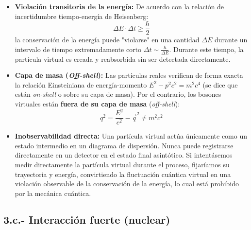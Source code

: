 \begin{observacion}
\begin{itemize}
    \item \textbf{Violación transitoria de la energía:} De acuerdo con la relación de incertidumbre tiempo-energía de Heisenberg:
    \begin{equation}
        \Delta E \cdot \Delta t \ge \frac{\hbar}{2}
    \end{equation}
    la conservación de la energía puede "violarse" en una cantidad $\Delta E$ durante un intervalo de tiempo extremadamente corto $\Delta t \sim \frac{\hbar}{\Delta E}$. Durante este tiempo, la partícula virtual es creada y reabsorbida sin ser detectada directamente.
    
    \item \textbf{Capa de masa (\textit{Off-shell}):} Las partículas reales verifican de forma exacta la relación Einsteiniana de energía-momento $E^2 - p^2 c^2 = m^2 c^4$ (se dice que están \textit{on-shell} o sobre su capa de masa). Por el contrario, los bosones virtuales están \textbf{fuera de su capa de masa} (\textit{off-shell}):
    \begin{equation}
        q^2 = \frac{E^2}{c^2} - \vec{q}^2 \neq m^2 c^2
    \end{equation}
    
    \item \textbf{Inobservabilidad directa:} Una partícula virtual actúa únicamente como un estado intermedio en un diagrama de dispersión. Nunca puede registrarse directamente en un detector en el estado final asintótico. Si intentásemos medir directamente la partícula virtual durante el proceso, fijaríamos su trayectoria y energía, convirtiendo la fluctuación cuántica virtual en una violación observable de la conservación de la energía, lo cual está prohibido por la mecánica cuántica.
\end{itemize}
\end{observacion}








\newpage
\subsection{3.c.- Interacción fuerte (nuclear)}

